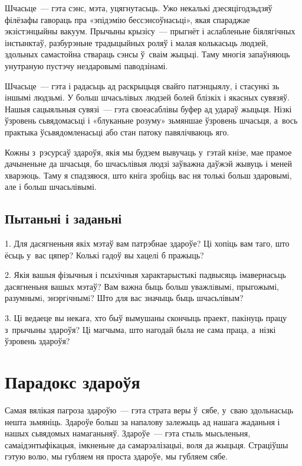Шчасьце~--- гэта сэнс, мэта, уцягнутасьць. Ужо некалькі дзесяцігодзьдзяў філёзафы гавораць пра «эпідэмію бессэнсоўнасьці», якая спараджае экзістэнцыйны вакуум. Прычыны крызісу~--- прыгнёт і аслабленьне біялягічных інстынктаў, разбурэньне традыцыйных роляў і малая колькасьць людзей, здольных самастойна ствараць сэнсы ў~сваім жыцьці. Таму многія запаўняюць унутраную пустэчу нездаровымі паводзінамі.

Шчасьце~--- гэта і радасьць ад раскрыцьця свайго патэнцыялу, і стасункі зь іншымі людзьмі. У больш шчасьлівых людзей болей блізкіх і якасных сувязяў. Нашыя сацыяльныя сувязі~--- гэта своеасаблівы буфер ад удараў жыцьця. Нізкі ўзровень сьвядомасьці і «блуканьне розуму» зьмяншае ўзровень шчасьця, а~вось практыка ўсьвядомленасьці або стан патоку павялічваюць яго.

Кожны з~рэсурсаў здароўя, якія мы будзем вывучаць у~гэтай кнізе, мае прамое дачыненьне да шчасьця, бо шчасьлівыя людзі заўважна даўжэй жывуць і меней хварэюць. Таму я спадзяюся, што кніга зробіць вас ня толькі больш здаровымі, але і больш шчасьлівымі.


\subsection*{Пытаньні і заданьні}

1. Для дасягненьня якіх мэтаў вам патрэбнае здароўе? Ці хопіць вам таго, што ёсьць у~вас цяпер? Колькі гадоў вы хацелі б пражыць?

2. Якія вашыя фізычныя і псыхічныя характарыстыкі падвысяць імавернасьць дасягненьня вашых мэтаў? Вам важна быць больш уважлiвымi, прыгожымі, разумнымi, энэргiчнымi? Што для вас значыць быць шчасьлівым?

3. Ці ведаеце вы некага, хто быў вымушаны скончыць праект, пакінуць працу з~прычыны здароўя? Ці магчыма, што нагодай была не сама праца, а~нізкі ўзровень здароўя?


\section{Парадокс здароўя}

Самая вялікая пагроза здароўю~--- гэта страта веры ў~сябе, у~сваю здольнасьць нешта зьмяніць. Здароўе больш за напалову залежыць ад нашага жаданьня і нашых сьвядомых намаганьняў. Здароўе~--- гэта стыль мысьленьня, самаідэнтыфікацыя, імкненьне да самарэалізацыі, воля да жыцьця. Страціўшы гэтую волю, мы губляем ня проста здароўе, мы губляем сябе. 

